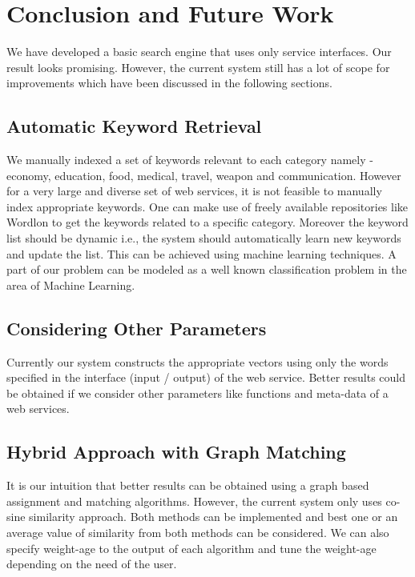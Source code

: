 \documentclass[12pt, oneside]{book}
\begin{document}
\chapter{Conclusion and Future Work}
We have developed a basic search engine that uses only service interfaces. Our result looks promising. However, the current system still has a lot of scope for improvements which have been discussed in the following sections.
\section{Automatic Keyword Retrieval}
We manually indexed a set of keywords relevant to each category namely - economy, education, food, medical, travel, weapon and communication. However for a very large and diverse set of web services, it is not feasible to manually index appropriate keywords. One can make use of freely available repositories like Wordlon to get the keywords related to a specific category. Moreover the keyword list should be dynamic i.e., the system should automatically learn new keywords and update the list. This can be achieved using machine learning techniques. A part of our problem can be modeled as a well known classification problem in the area of Machine Learning.
\section{Considering Other Parameters}
Currently our system constructs the appropriate vectors using only the words specified in the interface (input / output) of the web service. Better results could be obtained if we consider other parameters like functions and meta-data of a web services.
\section{Hybrid Approach with Graph Matching}
It is our intuition that better results can be obtained using a graph based assignment and matching algorithms. However, the current system only uses co-sine similarity approach. Both methods can be implemented and best one or an average value of similarity from both methods can be considered. We can also specify weight-age to the output of each algorithm and tune the weight-age depending on the need of the user.

\pagebreak


%
%
\end{document}
